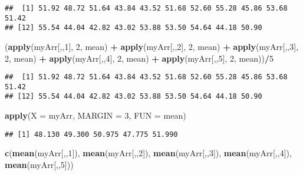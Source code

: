 \documentclass[]{book}
\newenvironment{Shaded}{\begin{snugshade}}{\end{snugshade}}
\newcommand{\KeywordTok}[1]{\textcolor[rgb]{0.13,0.29,0.53}{\textbf{#1}}}
\newcommand{\DataTypeTok}[1]{\textcolor[rgb]{0.13,0.29,0.53}{#1}}
\newcommand{\DecValTok}[1]{\textcolor[rgb]{0.00,0.00,0.81}{#1}}
\newcommand{\StringTok}[1]{\textcolor[rgb]{0.31,0.60,0.02}{#1}}
\newcommand{\OperatorTok}[1]{\textcolor[rgb]{0.81,0.36,0.00}{\textbf{#1}}}
\newcommand{\NormalTok}[1]{#1}
\theoremstyle{definition}
\theoremstyle{definition}
\theoremstyle{definition}
\theoremstyle{remark}
\begin{document}
\begin{verbatim}
##  [1] 51.92 48.72 51.64 43.84 43.52 51.68 52.60 55.28 45.86 53.68 51.42
## [12] 55.54 44.04 42.82 43.02 53.88 53.50 54.64 44.18 50.90
\end{verbatim}

\begin{Shaded}
\begin{Highlighting}[]
\NormalTok{(}\KeywordTok{apply}\NormalTok{(myArr[,,}\DecValTok{1}\NormalTok{], }\DecValTok{2}\NormalTok{, mean) }\OperatorTok{+}\StringTok{ }\KeywordTok{apply}\NormalTok{(myArr[,,}\DecValTok{2}\NormalTok{], }\DecValTok{2}\NormalTok{, mean) }\OperatorTok{+}\StringTok{ }
\StringTok{  }\KeywordTok{apply}\NormalTok{(myArr[,,}\DecValTok{3}\NormalTok{], }\DecValTok{2}\NormalTok{, mean) }\OperatorTok{+}\StringTok{ }\KeywordTok{apply}\NormalTok{(myArr[,,}\DecValTok{4}\NormalTok{], }\DecValTok{2}\NormalTok{, mean) }\OperatorTok{+}\StringTok{ }
\StringTok{  }\KeywordTok{apply}\NormalTok{(myArr[,,}\DecValTok{5}\NormalTok{], }\DecValTok{2}\NormalTok{, mean))}\OperatorTok{/}\DecValTok{5}
\end{Highlighting}
\end{Shaded}

\begin{verbatim}
##  [1] 51.92 48.72 51.64 43.84 43.52 51.68 52.60 55.28 45.86 53.68 51.42
## [12] 55.54 44.04 42.82 43.02 53.88 53.50 54.64 44.18 50.90
\end{verbatim}

\begin{Shaded}
\begin{Highlighting}[]
\KeywordTok{apply}\NormalTok{(}\DataTypeTok{X =}\NormalTok{ myArr, }\DataTypeTok{MARGIN =} \DecValTok{3}\NormalTok{, }\DataTypeTok{FUN =}\NormalTok{ mean)}
\end{Highlighting}
\end{Shaded}

\begin{verbatim}
## [1] 48.130 49.300 50.975 47.775 51.990
\end{verbatim}

\begin{Shaded}
\begin{Highlighting}[]
\KeywordTok{c}\NormalTok{(}\KeywordTok{mean}\NormalTok{(myArr[,,}\DecValTok{1}\NormalTok{]), }\KeywordTok{mean}\NormalTok{(myArr[,,}\DecValTok{2}\NormalTok{]), }\KeywordTok{mean}\NormalTok{(myArr[,,}\DecValTok{3}\NormalTok{]), }
  \KeywordTok{mean}\NormalTok{(myArr[,,}\DecValTok{4}\NormalTok{]), }\KeywordTok{mean}\NormalTok{(myArr[,,}\DecValTok{5}\NormalTok{]))}
\end{Highlighting}
\end{Shaded}
\end{document}
